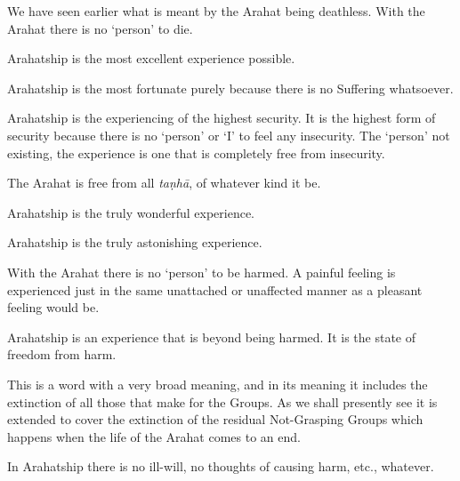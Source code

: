 We have seen earlier what is meant by the Arahat being deathless. With the Arahat there is no `person' to die.


Arahatship is the most excellent experience possible.


Arahatship is the most fortunate purely because there is no Suffering whatsoever.


Arahatship is the experiencing of the highest security. It is the highest form of security because there is no `person' or `I' to feel any insecurity. The `person' not existing, the experience is one that is completely free from insecurity.


The Arahat is free from all \emph{taṇhā}, of whatever kind it be.


Arahatship is the truly wonderful experience.


Arahatship is the truly astonishing experience.


With the Arahat there is no `person' to be harmed. A painful feeling is experienced just in the same unattached or unaffected manner as a pleasant feeling would be.


Arahatship is an experience that is beyond being harmed. It is the state of freedom from harm.


This is a word with a very broad meaning, and in its meaning it includes the extinction of all those that make for the  Groups. As we shall presently see it is extended to cover the extinction of the residual Not-Grasping Groups which happens when the life of the Arahat comes to an end.


In Arahatship there is no ill-will, no thoughts of causing harm, etc., whatever.

